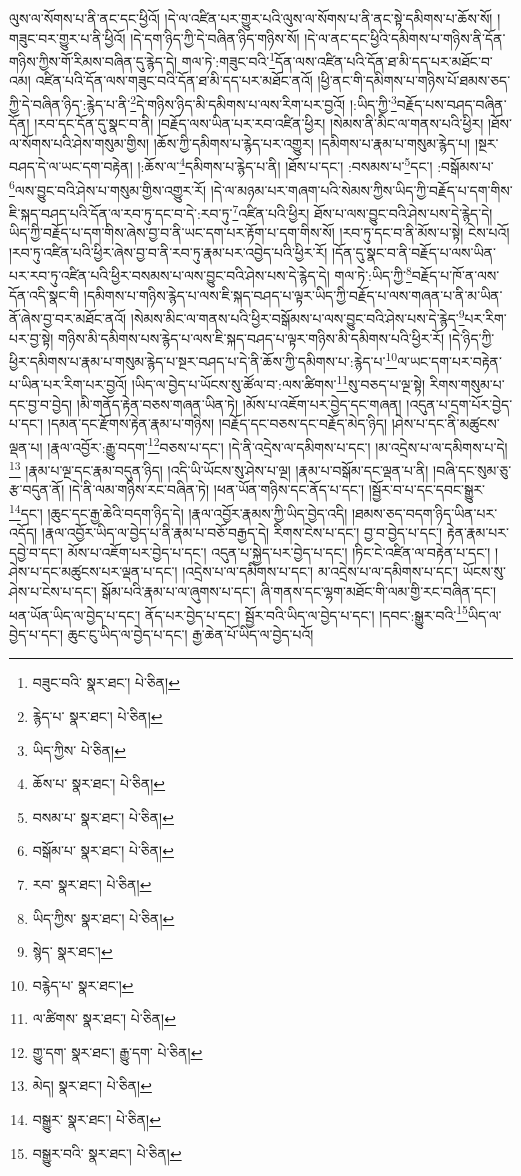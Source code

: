 ལུས་ལ་སོགས་པ་ནི་ནང་དང་ཕྱིའོ། །དེ་ལ་འཛིན་པར་གྱུར་པའི་ལུས་ལ་སོགས་པ་ནི་ནང་སྟེ་དམིགས་པ་ཆོས་སོ། །གཟུང་བར་གྱུར་པ་ནི་ཕྱིའོ། །དེ་དག་ཉིད་ཀྱི་དེ་བཞིན་ཉིད་གཉིས་སོ། །དེ་ལ་ནང་དང་ཕྱིའི་དམིགས་པ་གཉིས་ནི་དོན་གཉིས་ཀྱིས་གོ་རིམས་བཞིན་དུ་རྙེད་དེ། གལ་ཏེ་:གཟུང་བའི་\footnote{བཟུང་བའི་  སྣར་ཐང་།  པེ་ཅིན། }དོན་ལས་འཛིན་པའི་དོན་ཐ་མི་དད་པར་མཐོང་བ་འམ། འཛིན་པའི་དོན་ལས་གཟུང་བའི་དོན་ཐ་མི་དད་པར་མཐོང་ནའོ། །ཕྱི་ནང་གི་དམིགས་པ་གཉིས་པོ་ཐམས་ཅད་ཀྱི་དེ་བཞིན་ཉིད་:རྙེད་པ་ནི་\footnote{རྙེད་པ་  སྣར་ཐང་།  པེ་ཅིན། }དེ་གཉིས་ཉིད་མི་དམིགས་པ་ལས་རིག་པར་བྱའོ། །:ཡིད་ཀྱི་\footnote{ཡིད་ཀྱིས་  པེ་ཅིན། }བརྗོད་པས་བཤད་བཞིན་དོན། །རབ་དང་དོན་དུ་སྣང་བ་ནི། །བརྗོད་ལས་ཡིན་པར་རབ་འཛིན་ཕྱིར། །སེམས་ནི་མིང་ལ་གནས་པའི་ཕྱིར། །ཐོས་ལ་སོགས་པའི་ཤེས་གསུམ་གྱིས། །ཆོས་ཀྱི་དམིགས་པ་རྙེད་པར་འགྱུར། །དམིགས་པ་རྣམ་པ་གསུམ་རྙེད་པ། །སྔར་བཤད་དེ་ལ་ཡང་དག་བརྟེན། །:ཆོས་ལ་\footnote{ཆོས་པ་  སྣར་ཐང་།  པེ་ཅིན། }དམིགས་པ་རྙེད་པ་ནི། །ཐོས་པ་དང་། :བསམས་པ་\footnote{བསམ་པ་  སྣར་ཐང་།  པེ་ཅིན། }དང་། :བསྒོམས་པ་\footnote{བསྒོམ་པ་  སྣར་ཐང་།  པེ་ཅིན། }ལས་བྱུང་བའི་ཤེས་པ་གསུམ་གྱིས་འགྱུར་རོ། །དེ་ལ་མཉམ་པར་གཞག་པའི་སེམས་ཀྱིས་ཡིད་ཀྱི་བརྗོད་པ་དག་གིས་ཇི་སྐད་བཤད་པའི་དོན་ལ་རབ་ཏུ་དང་བ་དེ་:རབ་ཏུ་\footnote{རབ་  སྣར་ཐང་།  པེ་ཅིན། }འཛིན་པའི་ཕྱིར། ཐོས་པ་ལས་བྱུང་བའི་ཤེས་པས་དེ་རྙེད་དེ། ཡིད་ཀྱི་བརྗོད་པ་དག་གིས་ཞེས་བྱ་བ་ནི་ཡང་དག་པར་རྟོག་པ་དག་གིས་སོ། །རབ་ཏུ་དང་བ་ནི་མོས་པ་སྟེ། ངེས་པའོ། །རབ་ཏུ་འཛིན་པའི་ཕྱིར་ཞེས་བྱ་བ་ནི་རབ་ཏུ་རྣམ་པར་འབྱེད་པའི་ཕྱིར་རོ། །དོན་དུ་སྣང་བ་ནི་བརྗོད་པ་ལས་ཡིན་པར་རབ་ཏུ་འཛིན་པའི་ཕྱིར་བསམས་པ་ལས་བྱུང་བའི་ཤེས་པས་དེ་རྙེད་དེ། གལ་ཏེ་:ཡིད་ཀྱི་\footnote{ཡིད་ཀྱིས་  སྣར་ཐང་།  པེ་ཅིན། }བརྗོད་པ་ཁོ་ན་ལས་དོན་འདི་སྣང་གི །དམིགས་པ་གཉིས་རྙེད་པ་ལས་ཇི་སྐད་བཤད་པ་ལྟར་ཡིད་ཀྱི་བརྗོད་པ་ལས་གཞན་པ་ནི་མ་ཡིན་ནོ་ཞེས་བྱ་བར་མཐོང་ནའོ། །སེམས་མིང་ལ་གནས་པའི་ཕྱིར་བསྒོམས་པ་ལས་བྱུང་བའི་ཤེས་པས་དེ་རྙེད་\footnote{སྙེད་  སྣར་ཐང་། }པར་རིག་པར་བྱ་སྟེ། གཉིས་མི་དམིགས་པས་རྙེད་པ་ལས་ཇི་སྐད་བཤད་པ་ལྟར་གཉིས་མི་དམིགས་པའི་ཕྱིར་རོ། །དེ་ཉིད་ཀྱི་ཕྱིར་དམིགས་པ་རྣམ་པ་གསུམ་རྙེད་པ་སྔར་བཤད་པ་དེ་ནི་ཆོས་ཀྱི་དམིགས་པ་:རྙེད་པ་\footnote{བརྙེད་པ་  སྣར་ཐང་། }ལ་ཡང་དག་པར་བརྟེན་པ་ཡིན་པར་རིག་པར་བྱའོ། །ཡིད་ལ་བྱེད་པ་ཡོངས་སུ་ཚོལ་བ་:ལས་ཚིགས་\footnote{ལ་ཚིགས་  སྣར་ཐང་།  པེ་ཅིན། }སུ་བཅད་པ་ལྔ་སྟེ། རིགས་གསུམ་པ་དང་བྱ་བ་བྱེད། །མི་གནོད་རྟེན་བཅས་གཞན་ཡིན་ཏེ། །མོས་པ་འཇོག་པར་བྱེད་དང་གཞན། །འདུན་པ་དྲག་པོར་བྱེད་པ་དང་། །དམན་དང་རྫོགས་རྟེན་རྣམ་པ་གཉིས། །བརྗོད་དང་བཅས་དང་བརྗོད་མེད་ཉིད། །ཤེས་པ་དང་ནི་མཚུངས་ལྡན་པ། །རྣལ་འབྱོར་:རྒྱུ་བདག་\footnote{གྱུ་དག་  སྣར་ཐང་། རྒྱུ་དག་  པེ་ཅིན། }བཅས་པ་དང་། །དེ་ནི་འདྲེས་ལ་དམིགས་པ་དང་། །མ་འདྲེས་པ་ལ་དམིགས་པ་དེ།\footnote{མེད།  སྣར་ཐང་།  པེ་ཅིན། } །རྣམ་པ་ལྔ་དང་རྣམ་བདུན་ཉིད། །འདི་ཡི་ཡོངས་སུ་ཤེས་པ་ལྔ། །རྣམ་པ་བསྒོམ་དང་ལྡན་པ་ནི། །བཞི་དང་སུམ་ཅུ་རྩ་བདུན་ནོ། །དེ་ནི་ལམ་གཉིས་རང་བཞིན་ཏེ། །ཕན་ཡོན་གཉིས་དང་ནོད་པ་དང་། །སྦྱོར་བ་པ་དང་དབང་སྒྱུར་\footnote{བསྒྱུར་  སྣར་ཐང་།  པེ་ཅིན། }དང་། །ཆུང་དང་རྒྱ་ཆེའི་བདག་ཉིད་དེ། །རྣལ་འབྱོར་རྣམས་ཀྱི་ཡིད་བྱེད་འདི། །ཐམས་ཅད་བདག་ཉིད་ཡིན་པར་འདོད། །རྣལ་འབྱོར་ཡིད་ལ་བྱེད་པ་ནི་རྣམ་པ་བཅོ་བརྒྱད་དེ། རིགས་ངེས་པ་དང་། བྱ་བ་བྱེད་པ་དང་། རྟེན་རྣམ་པར་དབྱེ་བ་དང་། མོས་པ་འཇོག་པར་བྱེད་པ་དང་། འདུན་པ་སྐྱེད་པར་བྱེད་པ་དང་། །ཏིང་ངེ་འཛིན་ལ་བརྟེན་པ་དང་། །ཤེས་པ་དང་མཚུངས་པར་ལྡན་པ་དང་། །འདྲེས་པ་ལ་དམིགས་པ་དང་། མ་འདྲེས་པ་ལ་དམིགས་པ་དང་། ཡོངས་སུ་ཤེས་པ་ངེས་པ་དང་། སྒོམ་པའི་རྣམ་པ་ལ་ཞུགས་པ་དང་། ཞི་གནས་དང་ལྷག་མཐོང་གི་ལམ་གྱི་རང་བཞིན་དང་། ཕན་ཡོན་ཡིད་ལ་བྱེད་པ་དང་། ནོད་པར་བྱེད་པ་དང་། སྦྱོར་བའི་ཡིད་ལ་བྱེད་པ་དང་། །དབང་:སྒྱུར་བའི་\footnote{བསྒྱུར་བའི་  སྣར་ཐང་།  པེ་ཅིན། }ཡིད་ལ་བྱེད་པ་དང་། ཆུང་ངུ་ཡིད་ལ་བྱེད་པ་དང་། རྒྱ་ཆེན་པོ་ཡིད་ལ་བྱེད་པའོ། 